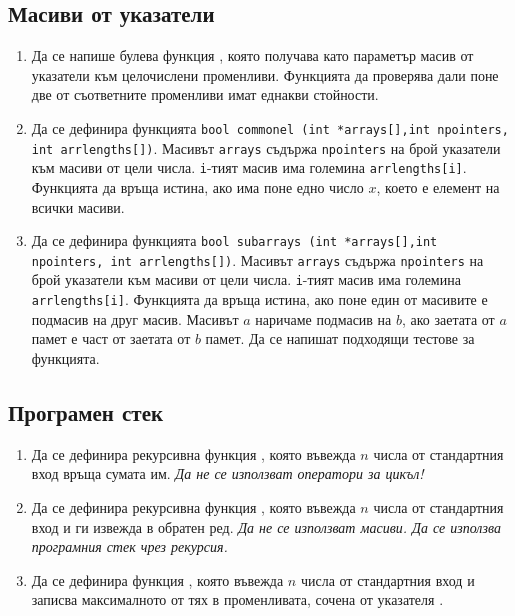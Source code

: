 {\subsection {Масиви от указатели}
\begin{enumerate}[resume]
  \item Да се напише булева функция , която получава като параметър масив  от указатели към целочислени променливи. Функцията да проверява дали поне две от съответните променливи имат еднакви стойности.
  \item Да се дефинира функцията  \texttt{bool commonel (int *arrays[],int npointers, int arrlengths[])}. Масивът \texttt{arrays} съдържа \texttt{npointers} на брой указатели към масиви от цели числа. \texttt{i}-тият масив има големина \texttt{arrlengths[i]}. Функцията да връща истина, ако има поне едно число $x$, което е елемент на всички масиви.
  \item Да се дефинира функцията \texttt{bool subarrays (int *arrays[],int npointers, int arrlengths[])}. Масивът \texttt{arrays} съдържа \texttt{npointers} на брой указатели към масиви от цели числа. \texttt{i}-тият масив има големина \texttt{arrlengths[i]}. Функцията да връща истина, ако поне един от масивите е подмасив на друг масив. Масивът $a$ наричаме подмасив на $b$, ако заетата от $a$ памет е част от заетата от $b$ памет. Да се напишат подходящи тестове за функцията.
\end{enumerate}

\subsection {Програмен стек}
\begin{enumerate}[resume]
  \item Да се дефинира рекурсивна функция , която въвежда $n$ числа от стандартния вход връща сумата им. \emph{Да не се използват оператори за цикъл!}

  \item Да се дефинира рекурсивна функция , която въвежда $n$ числа от стандартния вход и ги извежда в обратен ред. \emph{Да не се използват масиви. Да се използва програмния стек чрез рекурсия.}

  \item Да се дефинира функция , която въвежда $n$ числа от стандартния вход и записва максималното от тях в променливата, сочена от указателя .


\end{enumerate}}
